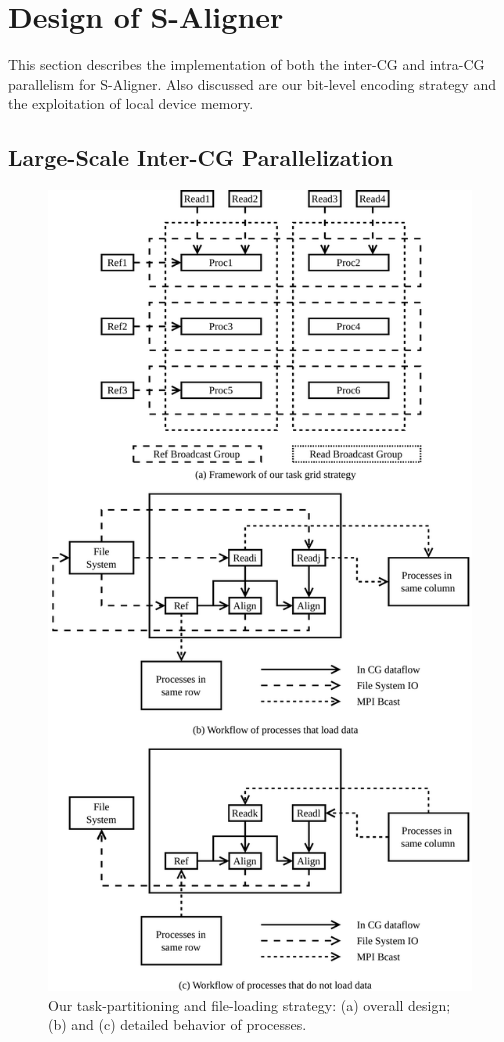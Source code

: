 \section{Design of S-Aligner}
\label{Implementation}

This section describes the implementation of both the inter-CG and
intra-CG parallelism for S-Aligner. Also discussed are our
bit-level encoding strategy and the exploitation of local device
memory.

\subsection{Large-Scale Inter-CG Parallelization}

\begin{figure}[!htb]
  \includegraphics[width=\linewidth]{figures/GridNew}
  \caption{Our task-partitioning and file-loading strategy: (a)
    overall design; (b) and (c) detailed behavior of processes.}
  \label{TaskGrid}
\end{figure}


